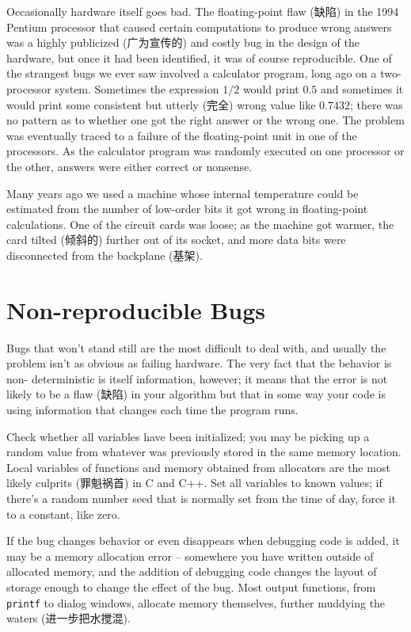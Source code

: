 Occasionally hardware itself goes bad. The floating-point flaw (缺陷) in
the 1994 Pentium processor that caused certain computations to produce
wrong answers was a highly publicized (广为宣传的) and costly bug in the
design of the hardware, but once it had been identified, it was of course
reproducible.  One of the strangest bugs we ever saw involved a calculator
program, long ago on a two-processor system.  Sometimes the expression
$1/2$ would print $0.5$ and sometimes it would print some consistent but
utterly (完全) wrong value like $0.7432$; there was no pattern as to
whether one got the right answer or the wrong one. The problem was
eventually traced to a failure of the floating-point unit in one of the
processors. As the calculator program was randomly executed on one
processor or the other, answers were either correct or nonsense.

Many years ago we used a machine whose internal temperature could be
estimated from the number of low-order bits it got wrong in floating-point
calculations. One of the circuit cards was loose; as the machine got
warmer, the card tilted (倾斜的) further out of its socket, and more data
bits were disconnected from the backplane (基架).

\section{Non-reproducible Bugs}

Bugs that won't stand still are the most difficult to deal with, and
usually the problem isn't as obvious as failing hardware. The very fact
that the behavior is non- deterministic is itself information, however; it
means that the error is not likely to be a flaw (缺陷) in your algorithm
but that in some way your code is using information that changes each time
the program runs.

Check whether all variables have been initialized; you may be picking up a
random value from whatever was previously stored in the same memory
location.  Local variables of functions and memory obtained from allocators
are the most likely culprits (罪魁祸首) in C and C++. Set all variables to
known values; if there's a random number seed that is normally set from the
time of day, force it to a constant, like zero.

If the bug changes behavior or even disappears when debugging code is
added, it may be a memory allocation error -- somewhere you have written
outside of allocated memory, and the addition of debugging code changes the
layout of storage enough to change the effect of the bug. Most output
functions, from \verb'printf' to dialog windows, allocate memory
themselves, further muddying the waters (进一步把水搅混).


